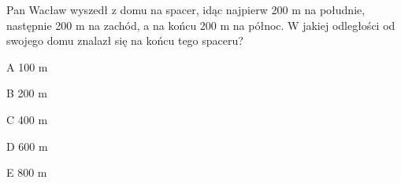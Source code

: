 \begin{tresc}
Pan Wacław wyszedł z domu na spacer, idąc najpierw 200 m na południe, następnie 200 m na zachód, a na końcu 200 m na północ. W jakiej odległości od swojego domu znalazł się na końcu tego spaceru?
\end{tresc}
\begin{wariant}{A} 100 m \end{wariant}
\begin{wariant}{B} 200 m \end{wariant}
\begin{wariant}{C} 400 m \end{wariant}
\begin{wariant}{D} 600 m \end{wariant}
\begin{wariant}{E} 800 m \end{wariant}

